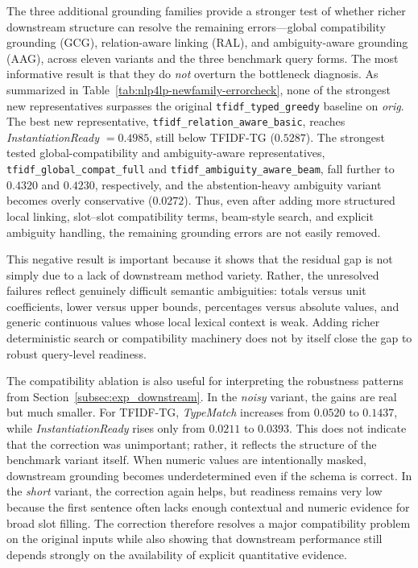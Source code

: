 \documentclass[pdflatex,sn-basic,Numbered]{sn-jnl}
\begin{document}
The three additional grounding families provide a stronger test of whether richer downstream structure can resolve the remaining errors---global compatibility grounding (GCG), relation-aware linking (RAL), and ambiguity-aware grounding (AAG), across eleven variants and the three benchmark query forms. The most informative result is that they do \emph{not} overturn the bottleneck diagnosis. As summarized in Table~\ref{tab:nlp4lp-newfamily-errorcheck}, none of the strongest new representatives surpasses the original \texttt{tfidf\_typed\_greedy} baseline on \emph{orig}. The best new representative, \texttt{tfidf\_relation\_aware\_basic}, reaches \textit{InstantiationReady} $=0.4985$, still below TFIDF-TG ($0.5287$). The strongest tested global-compatibility and ambiguity-aware representatives, \texttt{tfidf\_global\_compat\_full} and \texttt{tfidf\_ambiguity\_aware\_beam}, fall further to $0.4320$ and $0.4230$, respectively, and the abstention-heavy ambiguity variant becomes overly conservative ($0.0272$). Thus, even after adding more structured local linking, slot--slot compatibility terms, beam-style search, and explicit ambiguity handling, the remaining grounding errors are not easily removed.

This negative result is important because it shows that the residual gap is not simply due to a lack of downstream method variety. Rather, the unresolved failures reflect genuinely difficult semantic ambiguities: totals versus unit coefficients, lower versus upper bounds, percentages versus absolute values, and generic continuous values whose local lexical context is weak. Adding richer deterministic search or compatibility machinery does not by itself close the gap to robust query-level readiness.

The compatibility ablation is also useful for interpreting the robustness patterns from Section~\ref{subsec:exp_downstream}. In the \emph{noisy} variant, the gains are real but much smaller. For TFIDF-TG, \textit{TypeMatch} increases from $0.0520$ to $0.1437$, while \textit{InstantiationReady} rises only from $0.0211$ to $0.0393$. This does not indicate that the correction was unimportant; rather, it reflects the structure of the benchmark variant itself. When numeric values are intentionally masked, downstream grounding becomes underdetermined even if the schema is correct. In the \emph{short} variant, the correction again helps, but readiness remains very low because the first sentence often lacks enough contextual and numeric evidence for broad slot filling. The correction therefore resolves a major compatibility problem on the original inputs while also showing that downstream performance still depends strongly on the availability of explicit quantitative evidence.
\end{document}
